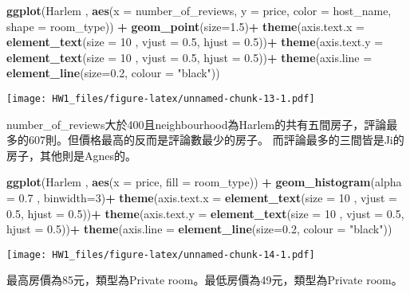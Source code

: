 \documentclass[]{article}
\newenvironment{Shaded}{\begin{snugshade}}{\end{snugshade}}
\newcommand{\DataTypeTok}[1]{\textcolor[rgb]{0.13,0.29,0.53}{#1}}
\newcommand{\DecValTok}[1]{\textcolor[rgb]{0.00,0.00,0.81}{#1}}
\newcommand{\FloatTok}[1]{\textcolor[rgb]{0.00,0.00,0.81}{#1}}
\newcommand{\KeywordTok}[1]{\textcolor[rgb]{0.13,0.29,0.53}{\textbf{#1}}}
\newcommand{\NormalTok}[1]{#1}
\newcommand{\OperatorTok}[1]{\textcolor[rgb]{0.81,0.36,0.00}{\textbf{#1}}}
\newcommand{\StringTok}[1]{\textcolor[rgb]{0.31,0.60,0.02}{#1}}
\begin{document}
\begin{Shaded}
\begin{Highlighting}[]
\KeywordTok{ggplot}\NormalTok{(Harlem , }\KeywordTok{aes}\NormalTok{(}\DataTypeTok{x =}\NormalTok{ number_of_reviews, }\DataTypeTok{y =}\NormalTok{ price, }\DataTypeTok{color =}\NormalTok{ host_name, }\DataTypeTok{shape =}\NormalTok{ room_type)) }\OperatorTok{+}
\StringTok{  }\KeywordTok{geom_point}\NormalTok{(}\DataTypeTok{size=}\FloatTok{1.5}\NormalTok{)}\OperatorTok{+}
\StringTok{  }\KeywordTok{theme}\NormalTok{(}\DataTypeTok{axis.text.x =} \KeywordTok{element_text}\NormalTok{(}\DataTypeTok{size =} \DecValTok{10}\NormalTok{ , }\DataTypeTok{vjust =} \FloatTok{0.5}\NormalTok{, }\DataTypeTok{hjust =} \FloatTok{0.5}\NormalTok{))}\OperatorTok{+}
\StringTok{  }\KeywordTok{theme}\NormalTok{(}\DataTypeTok{axis.text.y =} \KeywordTok{element_text}\NormalTok{(}\DataTypeTok{size =} \DecValTok{10}\NormalTok{ , }\DataTypeTok{vjust =} \FloatTok{0.5}\NormalTok{, }\DataTypeTok{hjust =} \FloatTok{0.5}\NormalTok{))}\OperatorTok{+}
\StringTok{  }\KeywordTok{theme}\NormalTok{(}\DataTypeTok{axis.line =} \KeywordTok{element_line}\NormalTok{(}\DataTypeTok{size=}\FloatTok{0.2}\NormalTok{, }\DataTypeTok{colour =} \StringTok{"black"}\NormalTok{))}
\end{Highlighting}
\end{Shaded}

\texttt{[image: HW1\_files/figure-latex/unnamed-chunk-13-1.pdf]}

number\_of\_reviews大於400且neighbourhood為Harlem的共有五間房子，評論最多的607則。但價格最高的反而是評論數最少的房子。
而評論最多的三間皆是Ji的房子，其他則是Agnes的。

\begin{Shaded}
\begin{Highlighting}[]
\KeywordTok{ggplot}\NormalTok{(Harlem , }\KeywordTok{aes}\NormalTok{(}\DataTypeTok{x =}\NormalTok{ price, }\DataTypeTok{fill =}\NormalTok{ room_type)) }\OperatorTok{+}\StringTok{ }\KeywordTok{geom_histogram}\NormalTok{(}\DataTypeTok{alpha =} \FloatTok{0.7}\NormalTok{ , }\DataTypeTok{binwidth=}\DecValTok{3}\NormalTok{)}\OperatorTok{+}
\StringTok{  }\KeywordTok{theme}\NormalTok{(}\DataTypeTok{axis.text.x =} \KeywordTok{element_text}\NormalTok{(}\DataTypeTok{size =} \DecValTok{10}\NormalTok{ , }\DataTypeTok{vjust =} \FloatTok{0.5}\NormalTok{, }\DataTypeTok{hjust =} \FloatTok{0.5}\NormalTok{))}\OperatorTok{+}
\StringTok{  }\KeywordTok{theme}\NormalTok{(}\DataTypeTok{axis.text.y =} \KeywordTok{element_text}\NormalTok{(}\DataTypeTok{size =} \DecValTok{10}\NormalTok{ , }\DataTypeTok{vjust =} \FloatTok{0.5}\NormalTok{, }\DataTypeTok{hjust =} \FloatTok{0.5}\NormalTok{))}\OperatorTok{+}
\StringTok{  }\KeywordTok{theme}\NormalTok{(}\DataTypeTok{axis.line =} \KeywordTok{element_line}\NormalTok{(}\DataTypeTok{size=}\FloatTok{0.2}\NormalTok{, }\DataTypeTok{colour =} \StringTok{"black"}\NormalTok{))}
\end{Highlighting}
\end{Shaded}

\texttt{[image: HW1\_files/figure-latex/unnamed-chunk-14-1.pdf]}

最高房價為85元，類型為Private room。最低房價為49元，類型為Private room。
\end{document}
